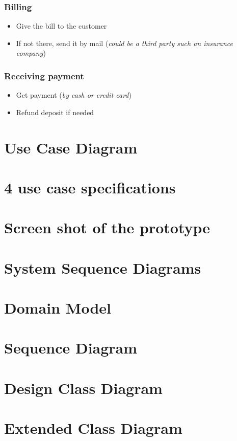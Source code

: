 \documentclass{report}
\begin{document}
\section{Billing}
    \begin{itemize}
        \item Give the bill to the customer
        \item If not there, send it by mail (\textit{could be a third party such an insurance company})
    \end{itemize}

\section{Receiving payment}
    \begin{itemize}
        \item Get payment (\textit{by cash or credit card})
        \item Refund deposit if needed
    \end{itemize}

\part{Use Case Diagram}
\part{4 use case specifications}
\part{Screen shot of the prototype}
\part{System Sequence Diagrams}
\part{Domain Model}
\part{Sequence Diagram}
\part{Design Class Diagram}
\part{Extended Class Diagram}
\end{document}
